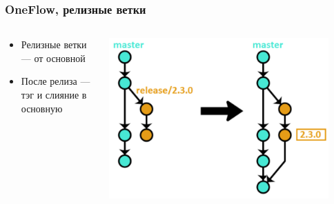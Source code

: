 \documentclass{../../slides-style}
\begin{document}
    \begin{frame}
        \frametitle{OneFlow, релизные ветки}
        \begin{columns}
            \begin{column}{0.4\textwidth}
                \begin{itemize}
                    \item Релизные ветки --- от основной
                    \item После релиза --- тэг и слияние в основную
                \end{itemize}
            \end{column}
            \begin{column}{0.6\textwidth}
                \begin{center}
                    \includegraphics[width=0.9\textwidth]{oneflow4.png}
                \end{center}
            \end{column}
        \end{columns}
    \end{frame}
\end{document}
